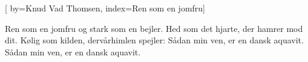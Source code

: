 
[
  by={Knud Vad Thomsen},
  index={Ren som en jomfru}]
  
\beginverse*
Ren som en jomfru og stark som en bejler.
Hed som det hjarte, der hamrer mod dit.
Kølig som kilden, dervårhimlen spejler:
Sådan min ven, er en dansk aquavit.
Sådan min ven, er en dansk aquavit.
\endverse
\endsong